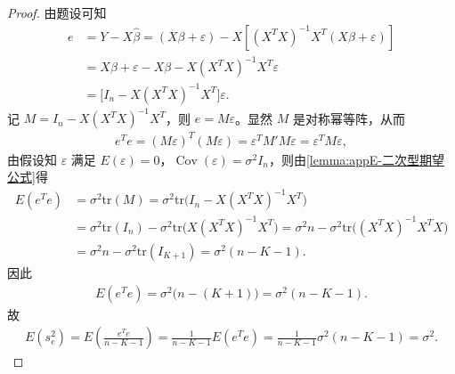 \documentclass[../main.tex]{subfiles}
\begin{document}
\begin{proof}
由题设可知
\begin{align*}
e &= Y - X\hat{\beta} = (X\beta+\varepsilon) - X[(X^TX)^{-1}X^T(X\beta+\varepsilon)] \\
&= X\beta+\varepsilon - X\beta - X(X^TX)^{-1}X^T\varepsilon \\
&= \bigl[I_n - X(X^TX)^{-1}X^T\bigr]\varepsilon.
\end{align*}
记 $M = I_n - X(X^TX)^{-1}X^T$，则 $e=M\varepsilon$。显然 $M$ 是对称幂等阵，从而
\begin{align*}
e^Te = (M\varepsilon)^T(M\varepsilon)=\varepsilon^T M' M \varepsilon = \varepsilon^T M \varepsilon,
\end{align*}
由假设知 $\varepsilon$ 满足 $E(\varepsilon)=0$，$\operatorname{Cov}(\varepsilon)=\sigma^2 I_n$，则由\cref{lemma:appE-二次型期望公式}得
\begin{align*}
E\left( e^Te \right) &=\sigma ^2\mathrm{tr}\left( M \right) =\sigma ^2\mathrm{tr}\bigl( I_n-X\left( X^TX \right) ^{-1}X^T \bigr) \\
&=\sigma ^2\mathrm{tr}\left( I_n \right) -\sigma ^2\mathrm{tr}\bigl( X\left( X^TX \right) ^{-1}X^T \bigr) =\sigma ^2n-\sigma ^2\mathrm{tr}\bigl( \left( X^TX \right) ^{-1}X^TX \bigr) \\
&=\sigma ^2n-\sigma ^2\mathrm{tr}\left( I_{K+1} \right) =\sigma ^2\left( n-K-1 \right) .
\end{align*}
因此
\begin{align*}
E(e^Te)=\sigma^2\bigl(n-(K+1)\bigr)=\sigma^2(n-K-1).
\end{align*}
故
\begin{align*}
E(s_e^2)=E\left(\frac{e^Te}{n-K-1}\right)=\frac{1}{n-K-1}E(e^Te)=\frac{1}{n-K-1}\sigma^2(n-K-1)=\sigma^2.
\end{align*}
\end{proof}
\end{document}

